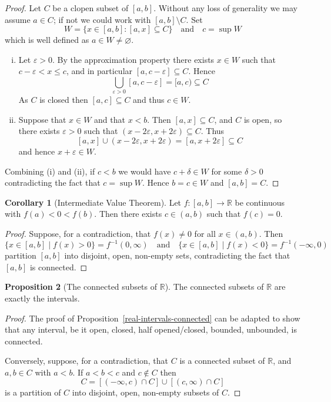 \documentclass[10pt,fleqn]{article}
\newcommand{\reals}{\mathbb{R}}
\newcommand{\eps}{\varepsilon}
\theoremstyle{definition} \newtheorem{defn}{Definition}[section]
\theoremstyle{plain}      \newtheorem{thm}[defn]{Theorem}
\theoremstyle{definition} \newtheorem{prop}[defn]{Proposition}
\theoremstyle{definition} \newtheorem{cor}[defn]{Corollary}
\theoremstyle{definition} \newtheorem{ex}[defn]{Example}
\theoremstyle{definition} \newtheorem{rem}[defn]{Remark}
\begin{document}
\begin{proof}
    Let $C$ be a clopen subset of $[a,b]$.
    Without any loss of generality we may assume $a\in C$; if not we could work with $[a,b]\setminus C$.
    Set
    \[
        W = \{x\in[a,b]\colon[a,x]\subseteq C\}\quad
        \text{and}\quad
        c = \sup W
    \]
    which is well defined as $a\in W\neq\varnothing$.
    \begin{enumerate}[(i)]
        \item Let $\eps>0$.
        By the approximation property there exists $x\in W$ such that $c-\eps<x\leq c$, and in particular $[a,c-\eps]\subseteq C$.
        Hence
        \[
            \bigcup_{\eps>0}[a,c-\eps]=
            [a,c)\subseteq C
        \]
        As $C$ is closed then $[a,c]\subseteq C$ and thus $c\in W$.
        \item Suppose that $x\in W$ and that $x<b$.
        Then $[a,x]\subseteq C$, and $C$ is open, so there exists $\eps>0$ such that $(x-2\eps,x+2\eps)\subseteq C$.
        Thus
        \[
            [a,x]\cup(x-2\eps,x+2\eps)=
            [a,x+2\eps]\subseteq C
        \]
        and hence $x+\eps\in W$.
    \end{enumerate}
    Combining (i) and (ii), if $c<b$ we would have $c+\delta\in W$ for some $\delta>0$ contradicting the fact that $c=\sup W$.
    Hence $b=c\in W$ and $[a,b]=C$.
\end{proof}

\begin{cor}[Intermediate Value Theorem]
    Let $f:[a,b]\to\reals$ be continuous with $f(a)<0<f(b)$.
    Then there exists $c\in(a,b)$ such that $f(c)=0$.
\end{cor}

\begin{proof}
    Suppose, for a contradiction, that $f(x)\neq0$ for all $x\in(a,b)$.
    Then
    \[
        \{x\in[a,b]\mid f(x)>0\}=
        f^{-1}(0,\infty)\quad
        \text{and}\quad
        \{x\in[a,b]\mid f(x)<0\}=
        f^{-1}(-\infty,0)
    \]
    partition $[a,b]$ into disjoint, open, non-empty sets, contradicting the fact that $[a,b]$ is connected.
\end{proof}

\begin{prop}[The connected subsets of $\reals$]
    The connected subsets of $\reals$ are exactly the intervals.
\end{prop}

\begin{proof}
    The proof of Proposition~\ref{real-intervals-connected} can be adapted to show that any interval, be it open, closed, half opened/closed, bounded, unbounded, is connected.

    Conversely, suppose, for a contradiction, that $C$ is a connected subset of $\reals$, and $a,b\in C$ with $a<b$.
    If $a<b<c$ and $c\not\in C$ then
    \[
        C = [(-\infty,c)\cap C]\cup[(c,\infty)\cap C]
    \]
    is a partition of $C$ into disjoint, open, non-empty subsets of $C$.
\end{proof}
\end{document}
